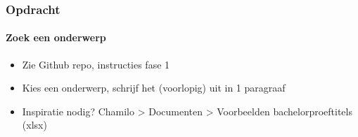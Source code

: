\documentclass[aspectratio=169]{beamer}
\begin{document}
\begin{frame}
  \frametitle{Opdracht}
  \framesubtitle{Zoek een onderwerp}

  \begin{itemize}
    \item Zie Github repo, instructies fase 1
    \item Kies een onderwerp, schrijf het (voorlopig) uit in 1 paragraaf
    \item Inspiratie nodig? Chamilo > Documenten > Voorbeelden bachelorproeftitels (xlsx)
  \end{itemize}

\end{frame}
\end{document}
